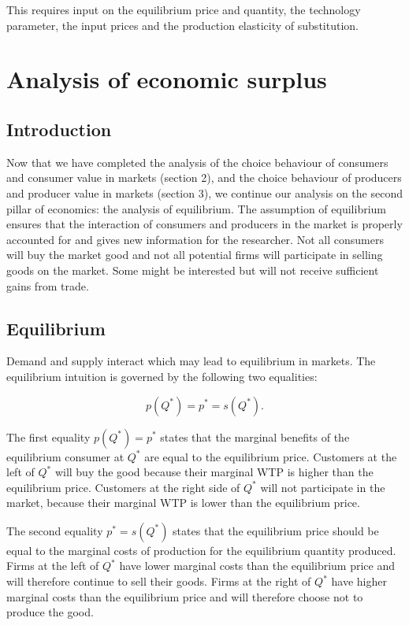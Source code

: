 \documentclass[
]{book}
\begin{document}
This requires input on the equilibrium price and quantity, the technology parameter, the input prices and the production elasticity of substitution.

\hypertarget{analysis-of-economic-surplus}{%
\section{Analysis of economic surplus}\label{analysis-of-economic-surplus}}

\hypertarget{introduction-2}{%
\subsection{Introduction}\label{introduction-2}}

Now that we have completed the analysis of the choice behaviour of consumers and consumer value in markets (section 2), and the choice behaviour of producers and producer value in markets (section 3), we continue our analysis on the second pillar of economics: the analysis of equilibrium. The assumption of equilibrium ensures that the interaction of consumers and producers in the market is properly accounted for and gives new information for the researcher. Not all consumers will buy the market good and not all potential firms will participate in selling goods on the market. Some might be interested but will not receive sufficient gains from trade.

\hypertarget{equilibrium}{%
\subsection{Equilibrium}\label{equilibrium}}

Demand and supply interact which may lead to equilibrium in markets. The equilibrium intuition is governed by the following two equalities:

\begin{equation}
p(Q^\ast)= p^\ast=s(Q^\ast).
\end{equation}

The first equality \(p(Q^\ast)= p^\ast\) states that the marginal benefits of the equilibrium consumer at \(Q^\ast\) are equal to the equilibrium price. Customers at the left of \(Q^\ast\) will buy the good because their marginal WTP is higher than the equilibrium price. Customers at the right side of \(Q^\ast\) will not participate in the market, because their marginal WTP is lower than the equilibrium price.

The second equality \(p^\ast=s(Q^\ast)\) states that the equilibrium price should be equal to the marginal costs of production for the equilibrium quantity produced. Firms at the left of \(Q^\ast\) have lower marginal costs than the equilibrium price and will therefore continue to sell their goods. Firms at the right of \(Q^\ast\) have higher marginal costs than the equilibrium price and will therefore choose not to produce the good.
\end{document}
